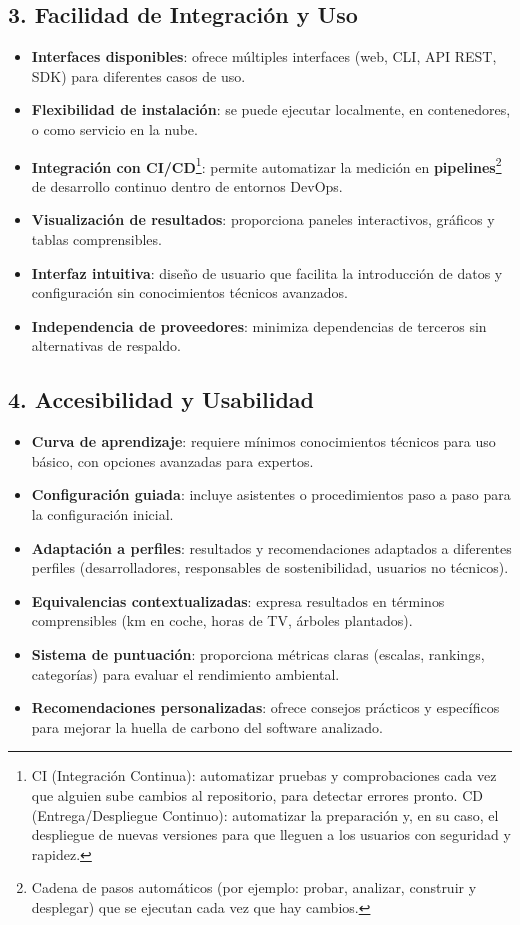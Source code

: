 \documentclass[12pt,a4paper]{report}
\begin{document}
\subsection*{3. Facilidad de Integración y Uso}
\begin{itemize}
  \item \textbf{Interfaces disponibles}: ofrece múltiples interfaces (web, CLI, API REST, SDK) para diferentes casos de uso.
  \item \textbf{Flexibilidad de instalación}: se puede ejecutar localmente, en contenedores, o como servicio en la nube.
  \item \textbf{Integración con CI/CD}\footnote{CI (Integración Continua): automatizar pruebas y comprobaciones cada vez que alguien sube cambios al repositorio, para detectar errores pronto. CD (Entrega/Despliegue Continuo): automatizar la preparación y, en su caso, el despliegue de nuevas versiones para que lleguen a los usuarios con seguridad y rapidez.}: permite automatizar la medición en \textbf{pipelines}\footnote{Cadena de pasos automáticos (por ejemplo: probar, analizar, construir y desplegar) que se ejecutan cada vez que hay cambios.} de desarrollo continuo dentro de entornos DevOps.
  \item \textbf{Visualización de resultados}: proporciona paneles interactivos, gráficos y tablas comprensibles.
  \item \textbf{Interfaz intuitiva}: diseño de usuario que facilita la introducción de datos y configuración sin conocimientos técnicos avanzados.
  \item \textbf{Independencia de proveedores}: minimiza dependencias de terceros sin alternativas de respaldo.
\end{itemize}

\subsection*{4. Accesibilidad y Usabilidad}
\begin{itemize}
  \item \textbf{Curva de aprendizaje}: requiere mínimos conocimientos técnicos para uso básico, con opciones avanzadas para expertos.
  \item \textbf{Configuración guiada}: incluye asistentes o procedimientos paso a paso para la configuración inicial.
  \item \textbf{Adaptación a perfiles}: resultados y recomendaciones adaptados a diferentes perfiles (desarrolladores, responsables de sostenibilidad, usuarios no técnicos).
  \item \textbf{Equivalencias contextualizadas}: expresa resultados en términos comprensibles (km en coche, horas de TV, árboles plantados).
  \item \textbf{Sistema de puntuación}: proporciona métricas claras (escalas, rankings, categorías) para evaluar el rendimiento ambiental.
  \item \textbf{Recomendaciones personalizadas}: ofrece consejos prácticos y específicos para mejorar la huella de carbono del software analizado.
\end{itemize}
\end{document}
